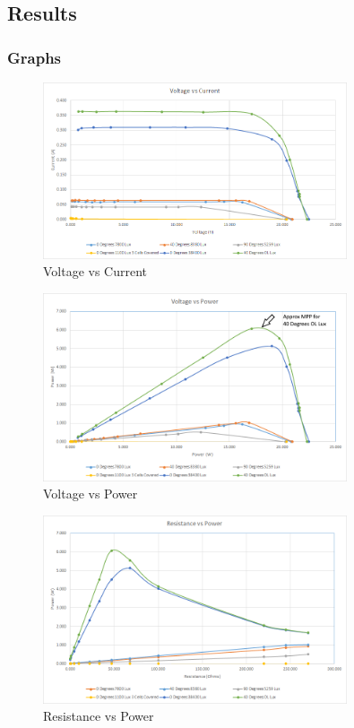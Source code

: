 \documentclass{article}
\begin{document}
	\subsection{Results}\label{section:Results}
	
	\subsubsection{Graphs}
		\begin{figure}[H]
			\centering
			\includegraphics[width=0.8\textwidth]{VoltagevsCurrent}
			\caption{Voltage vs Current}
			\label{fig:VoltagevsCurrent}
		\end{figure}
	
		\begin{figure}[H]
			\centering
			\includegraphics[width=0.8\textwidth]{VoltagevsPower}
			\caption{Voltage vs Power}
			\label{fig:VoltagevsPower}
		\end{figure}
	
		\begin{figure}[H]
			\centering
			\includegraphics[width=0.8\textwidth]{ResistancevsPower}
			\caption{Resistance vs Power}
			\label{fig:ResistancevsPower}
		\end{figure}
	
\end{document}
